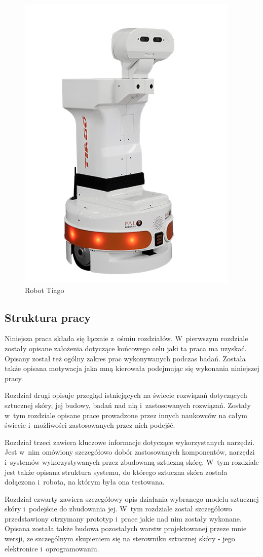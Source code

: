 \begin{figure}[!h]
    \centering 
    \includegraphics[width=0.5\linewidth]{img/tiago_zwykly.jpg}
    \caption{Robot Tiago \cite{b_site_tiago}}
    \label{f_tiago_zwykly}
\end{figure}

\subsection{Struktura pracy}
Niniejsza praca składa się łącznie z~ośmiu rozdziałów. W~pierwszym rozdziale zostały opisane założenia dotyczące końcowego celu jaki ta praca ma uzyskać. Opisany został też ogólny zakres prac wykonywanych podczas badań. Została także opisana motywacja jaka mną kierowała podejmując się wykonania niniejszej pracy.

Rozdział drugi opisuje przegląd istniejących na świecie rozwiązań dotyczących sztucznej skóry, jej budowy, badań nad nią i~zastosowanych rozwiązań. Zostały w~tym rozdziale opisane prace prowadzone przez innych naukowców na całym świecie i~możliwości zastosowanych przez nich podejść.

Rozdział trzeci zawiera kluczowe informacje dotyczące wykorzystanych narzędzi. Jest w~nim omówiony szczegółowo dobór zastosowanych komponentów, narzędzi i~systemów wykorzystywanych przez zbudowaną sztuczną skórę. W~tym rozdziale jest także opisana struktura systemu, do którego sztuczna skóra została dołączona i~robota, na którym była ona testowana.

Rozdział czwarty zawiera szczegółowy opis działania wybranego modelu sztucznej skóry i~podejście do zbudowania jej. W~tym rozdziale został szczegółowo przedstawiony otrzymany prototyp i~prace jakie nad nim zostały wykonane. Opisana została także budowa pozostałych warstw projektowanej przeze mnie wersji, ze szczególnym skupieniem się na sterowniku sztucznej skóry - jego elektronice i~oprogramowaniu.

